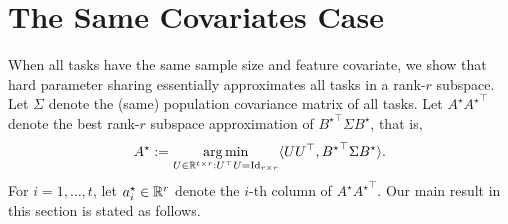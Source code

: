 \section{The Same Covariates Case}\label{sec_same}

When all tasks have the same sample size and feature covariate, we show that hard parameter sharing essentially approximates all tasks in a rank-$r$ subspace.
Let $\Sigma$ denote the (same) population covariance matrix of all tasks.
Let $A^{\star} {A^{\star}}^{\top}$ denote the best rank-$r$ subspace approximation of ${B^{\star}}^\top\Sigma B^{\star}$, that is,
\[ A^{\star} := \operatorname*{arg\,min}_{U\in\mathbb{R}^{t\times r} : U^{\top} U = \operatorname{Id}_{r\times r}} \langle U U^{\top}, {B^{\star}}^{\top} \Sigma B^{\star} \rangle. \]
For $i = 1,\dots, t$, let $a_i^{\star} \in\mathbb{R}^r$ denote the $i$-th column of $A^{\star}{A^{\star}}^{\top}$.
Our main result in this section is stated as follows.


